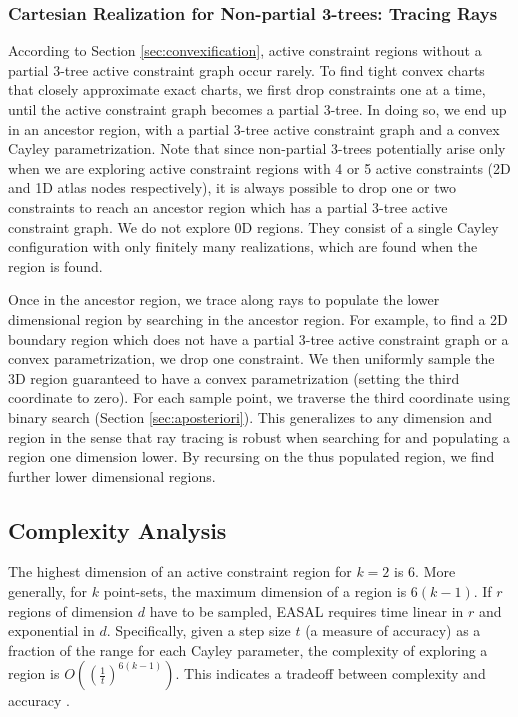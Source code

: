 \subsubsection{Cartesian Realization for Non-partial 3-trees: Tracing Rays}
\label{sec:raytracing}
According to Section \ref{sec:convexification}, active constraint regions
without a partial 3-tree active constraint graph occur rarely.  To find tight
convex charts that closely approximate exact charts, we first drop constraints
one at a time, until the active constraint graph becomes a partial 3-tree. In
doing so, we end up in an ancestor region, with a partial 3-tree active
constraint graph and a convex Cayley parametrization. Note that since
non-partial 3-trees potentially arise only when we are exploring active
constraint regions with 4 or 5 active constraints (2D and 1D atlas nodes
respectively), it is always possible to drop one or two constraints to reach an
ancestor region which has a partial 3-tree active constraint graph. We do not
explore 0D regions. They consist of a single Cayley configuration with only
finitely many realizations, which are found when the region is found.

Once in the ancestor region, we trace along rays to populate the lower
dimensional region by searching in the ancestor region. For example, to find a
2D boundary region which does not have a partial 3-tree active constraint graph
or a convex parametrization, we drop one constraint. We then uniformly sample
the 3D region guaranteed to have a convex parametrization (setting the third
coordinate to zero). For each sample point, we traverse the third coordinate
using binary search (Section \ref{sec:aposteriori}). This generalizes to any
dimension and region in the sense that ray tracing is robust when searching for
and populating a region one dimension lower. By recursing on the thus populated
region, we find further lower dimensional regions.




\subsection{Complexity Analysis}
\label{sec:complexity}
The highest dimension of an active constraint region for $k=2$ is 6.  More
generally, for $k$ point-sets, the maximum dimension of a region is $6(k-1)$.
If $r$ regions of dimension $d$ have to be sampled, EASAL requires time linear
in $r$ and exponential in $d$.  Specifically, given a step size $t$ (a measure
of accuracy) as a fraction of the range for each Cayley parameter, the
complexity of exploring a region is $O((\frac{1}{t})^{6(k-1)})$. This indicates 
a tradeoff between complexity and accuracy \cite{Ozkan2011}. 

